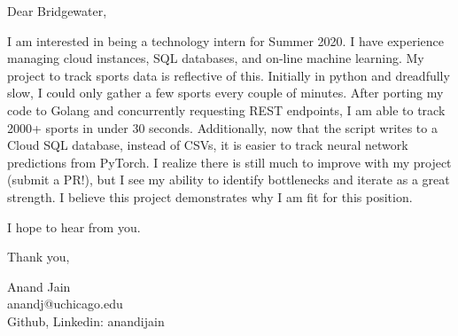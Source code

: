 \documentclass[11pt,a4paper]{letter} %
\begin{document}
Dear Bridgewater,

I am interested in being a technology intern for Summer 2020.
I have experience managing cloud instances, SQL databases, and on-line machine learning.
My project to track sports data is reflective of this. 
Initially in python and dreadfully slow, I could only gather a few sports every couple of minutes.
After porting my code to Golang and concurrently requesting REST endpoints, I am able to track 2000+ sports in under 30 seconds.
Additionally, now that the script writes to a Cloud SQL database, instead of CSVs, it is easier to track neural network predictions from PyTorch.
I realize there is still much to improve with my project (submit a PR!), but I see my ability to identify bottlenecks and iterate as a great strength. 
I believe this project demonstrates why I am fit for this position.

I hope to hear from you.

Thank you, 

Anand Jain\\
anandj@uchicago.edu\\
Github, Linkedin: anandijain
\end{document}
